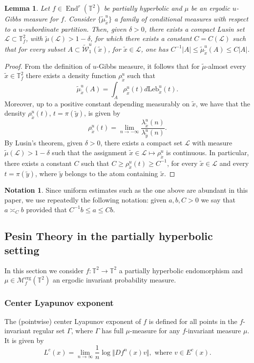 \documentclass[a4paper,11pt,reqno]{amsart}
\newcommand{\TT}{{\mathbb{T}^2}}
\newcommand{\TTf}{{\mathbb{T}_f^2}}
\newcommand{\cL}{{\mathcal L}}
\newcommand{\cM}{{\mathcal M}}
\newcommand{\cW}{{\mathcal W}}
\newcommand{\Leb}{\textrm{Leb}}
\newcommand{\tix}{\tilde{x}}
\newcommand{\tm}{\tilde{\mu}}
\newcommand{\w}{\widetilde{\cW}}
\newtheorem{lemma}[theorem]{Lemma}
\theoremstyle{definition}
\newtheorem*{notation}{Notation}
\begin{document}
\begin{lemma}
\label{lem:densidadeuniforme}
Let $f\in\operatorname{End}^r(\TT)$ be partially hyperbolic and $\mu$ be an ergodic $u$-Gibbs measure for $f$. Consider $\{\tm^u_{\tix}\}$ a family of conditional measures with respect to a $u$-subordinate partition. Then, given $\delta>0$, there exists a compact Lusin set $\cL\subset\TTf$, with $\tm(\cL)>1-\delta$, for which there exists a constant $C=C(\cL)$ such that for every subset $A\subset\w^u_1(\tix)$, for $\tix\in\cL$, one has $C^{-1}|A|\leq\tm^u_{\tix}(A)\leq C|A|$.
\end{lemma}
\begin{proof}
From the definition of $u$-Gibbs measure, it follows that for $\tm$-almost every $\tix\in\TTf$ there exists a density function $\rho^u_{\tix}$ such that 
\[
\tm^u_{\tix}(A)=\int_A\rho^u_{\tix}(t)d\Leb^u_{\tix}(t).
\]
Moreover, up to a positive constant depending measurably on $\tix$, we have that the density $\rho^u_{\tix}(t)$, $t=\pi(\tilde{y})$, is given by
\[
\rho^u_{\tix}(t) = \lim_{n\to-\infty}\frac{\lambda^u_{\tilde{x}}(n)}{\lambda^u_{\tilde{y}}(n)}.
\]
By Lusin's theorem, given $\delta>0$, there exists a compact set $\cL$ with measure $\tm(\cL)>1-\delta$ such that the assignment $\tix\in\cL\mapsto\rho^u_{\tix}$ is continuous. In particular, there exists a constant $C$ such that $ C\geq\rho^u_{\tix}(t)\geq C^{-1}$, for every $\tix\in\cL$ and every $t=\pi(\tilde{y})$, where $\tilde{y}$ belongs to the atom containing $\tix$. 
\end{proof}

\begin{notation}
Since uniform estimates such as the one above are abundant in this paper, we use repeatedly the following notation: given $a,b,C>0$ we say that $a\asymp_Cb$ provided that $C^{-1}b\leq a\leq Cb$.
\end{notation}

\subsection{Pesin Theory in the partially hyperbolic setting}

\label{sec:pesin}
In this section we consider $f:\TT\to\TT$ a partially hyperbolic endomorphism and $\mu\in\cM_f^{\operatorname{erg}}(\TT)$ an ergodic invariant probability measure. 
\subsubsection{Center Lyapunov exponent}
The (pointwise) center Lyapunov exponent of $f$ is defined for all points in the $f$-invariant regular set $\Gamma$, where $\Gamma$ has full $\mu$-measure for any $f$-invariant measure $\mu$. It is given by
$$L^c(x) = \lim_{n \to \infty} \dfrac{1}{n} \log \Vert Df^n(x) v \Vert, \mbox{ where } v \in E^c(x).$$
\end{document}
